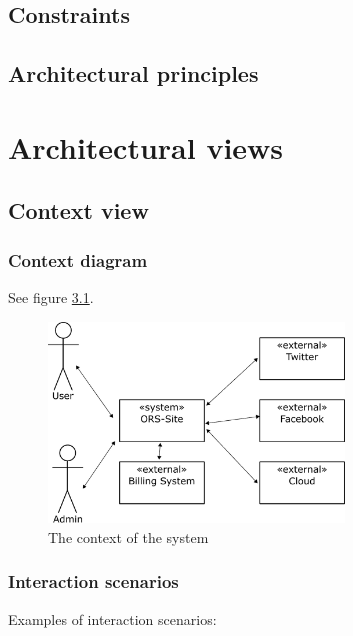 \documentclass[a4paper,11pt]{report}
\begin{document}
\section{Constraints}
\label{sec:constraints}

\section{Architectural principles}
\label{sec:arch-princ}


\chapter{Architectural views}
\label{cha:architectural-views}
\thispagestyle{fancy}

\section{Context view}
\label{sec:context-view}



\subsection{Context diagram}
\label{sec:context-diagram}

See figure \ref{fig:context}.

\begin{figure}[h!]
  \centering
  \includegraphics[width=0.7\textwidth]{figures/context_drawing}
  \caption{The context of the system}
  \label{fig:context}
\end{figure}




\subsection{Interaction scenarios}
\label{sec:inter-scen}
Examples of interaction scenarios:
\end{document}
